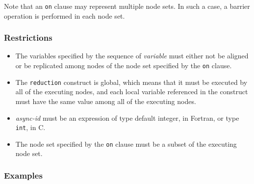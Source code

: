 Note that an {\tt on} clause may represent multiple node sets. In such a
case, a barrier operation is performed in each node set.

\subsubsection*{Restrictions}

\begin{itemize}
 \item The variables specified by the sequence of {\it variable} must
       either not be aligned or be replicated among nodes of the node
       set specified by the {\tt on} clause.
 \item The {\tt reduction} construct is global, which means that it must
       be executed by all of the executing nodes, and each local variable
       referenced in the construct must have the same value among all of
       the executing nodes.
 \item {\it async-id} must be an expression of type default integer, in
       Fortran, or type {\tt int}, in C.
 \item The node set specified by the {\tt on} clause must be a subset of the
       executing node set.
\end{itemize}

\subsubsection*{Examples}

